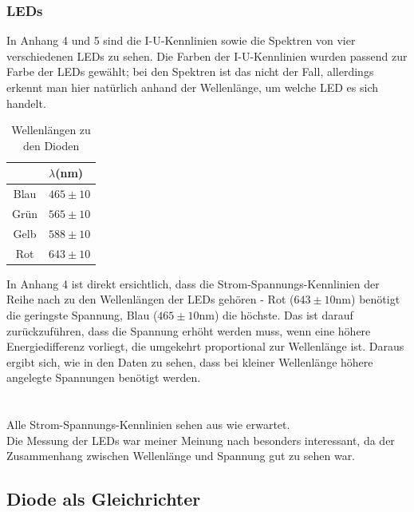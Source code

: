 \documentclass[12pt,a4paper,twopage]{article}
\begin{document}

\subsubsection{LEDs}
In Anhang 4 und 5 sind die I-U-Kennlinien sowie die Spektren von vier verschiedenen LEDs zu sehen. Die Farben der I-U-Kennlinien wurden passend zur Farbe der LEDs gewählt; bei den Spektren ist das nicht der Fall, allerdings erkennt man hier natürlich anhand der Wellenlänge, um welche LED es sich handelt. 

\begin{table}[H]
\centering
\begin{tabular}{|c|l|}
\hline
 & $\lambda$(nm)\\
\hline
Blau & $465 \pm 10$\\
Grün & $565 \pm 10$\\
Gelb & $588 \pm 10$\\
Rot & $643 \pm 10$\\
\hline
\end{tabular}
\caption{Wellenlängen zu den Dioden}
\end{table}

In Anhang 4 ist direkt ersichtlich, dass die Strom-Spannungs-Kennlinien der Reihe nach zu den Wellenlängen der LEDs gehören - Rot ($643\pm10$nm) benötigt die geringste Spannung, Blau ($465\pm10$nm) die höchste. Das ist darauf zurückzuführen, dass die Spannung erhöht werden muss, wenn eine höhere Energiedifferenz vorliegt, die umgekehrt proportional zur Wellenlänge ist. Daraus ergibt sich, wie in den Daten zu sehen, dass bei kleiner Wellenlänge höhere angelegte Spannungen benötigt werden.\\
\\
\\
Alle Strom-Spannungs-Kennlinien sehen aus wie erwartet.\\
Die Messung der LEDs war meiner Meinung nach besonders interessant, da der Zusammenhang zwischen Wellenlänge und Spannung gut zu sehen war. 

\subsection{Diode als Gleichrichter}
\end{document}
